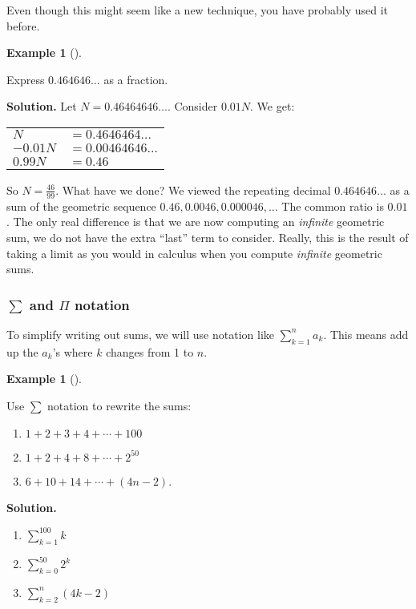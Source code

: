 \documentclass[10pt,]{book}
\theoremstyle{plain}
\theoremstyle{definition}
\newtheorem{example}[theorem]{Example}
\theoremstyle{definition}
\theoremstyle{definition}
\numberwithin{equation}{chapter}
\newcommand{\hrulethin}  {\noalign{\hrule height 0.04em}}
\def\d{\displaystyle}
\def\prod{\Pi}
\begin{document}
        Even though this might seem like a new technique, you have probably used it before.
\begin{example}[]\label{example-67}

            Express \(0.464646\ldots\) as a fraction.
\par\medskip\noindent%
\textbf{Solution.}\quad
            Let \(N = 0.46464646\ldots\). Consider \(0.01N\). We get:
\leavevmode%
\begin{table}
\centering
\begin{tabular}{ll}
\(N\)&\(= 0.4646464\ldots\)\tabularnewline[0pt]
\(-0.01N\)&\(= 0.00464646\ldots\)\tabularnewline\hrulethin
\(0.99N\)&\(= 0.46\)
\end{tabular}
\end{table}
\par

            So \(N = \frac{46}{99}\). What have we done? We viewed the repeating decimal \(0.464646\ldots\) as a sum of the geometric sequence \(0.46, 0.0046, 0.000046, \ldots\) The common ratio is \(0.01\). The only real difference is that we are now computing an \emph{infinite} geometric sum, we do not have the extra ``last'' term to consider. Really, this is the result of taking a limit as you would in calculus when you compute \emph{infinite} geometric sums.
\end{example}
\typeout{************************************************}
\typeout{Subsubsection  \(\sum\) and \(\prod\) notation}
\typeout{************************************************}
\subsubsection[\(\sum\) and \(\prod\) notation]{\(\sum\) and \(\prod\) notation}\label{subsubsection-3}

        To simplify writing out sums, we will use notation like \(\d\sum_{k=1}^n a_k\). This means add up the \(a_k\)'s where \(k\) changes from 1 to \(n\).
\begin{example}[]\label{example-68}

            Use \(\sum\) notation to rewrite the sums:
\leavevmode%
\begin{enumerate}
\item\hypertarget{li-885}{}\(1 + 2 + 3 + 4 + \cdots + 100\)%
\item\hypertarget{li-886}{}\(1 + 2 + 4 + 8 + \cdots + 2^{50}\)%
\item\hypertarget{li-887}{}\(6 + 10 + 14 + \cdots + (4n - 2)\).%
\end{enumerate}
\par\medskip\noindent%
\textbf{Solution.}\quad \leavevmode%
\begin{enumerate}
\item\hypertarget{li-888}{}\(\d\sum_{k=1}^{100} k\)%
\item\hypertarget{li-889}{}\(\d\sum_{k=0}^{50} 2^k\)%
\item\hypertarget{li-890}{}\(\d\sum_{k=2}^{n} (4k -2)\)%
\end{enumerate}
\end{example}
\par
\end{document}
